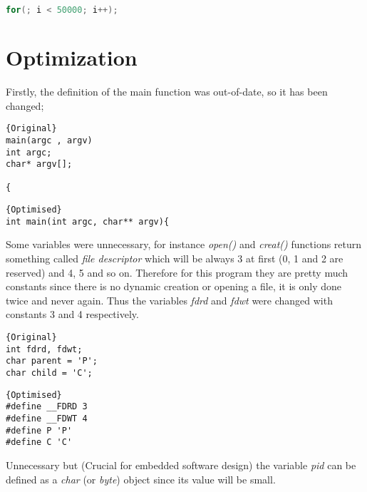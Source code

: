 \documentclass[11pt]{article}
\begin{document}
\begin{lstlisting}[language=C]
	for(; i < 50000; i++);
\end{lstlisting}

\section*{Optimization}

Firstly, the definition of the main function was out-of-date, so it has been changed;

\noindent\begin{minipage}{.45\textwidth}
\begin{lstlisting}[caption=Original,frame=tlrb]{Original}
main(argc , argv)
int argc; 
char* argv[];

{
\end{lstlisting}
\end{minipage}\hfill
\begin{minipage}{.50\textwidth}
\begin{lstlisting}[caption=Optimised,frame=tlrb]{Optimised}
int main(int argc, char** argv){
\end{lstlisting}
\end{minipage}

Some variables were unnecessary, for instance \textit{open()} and \textit{creat()} functions return something called \textit{file descriptor} which will be always 3 at first (0, 1 and 2 are reserved) and 4, 5 and so on. Therefore for this program they are pretty much constants since there is no dynamic creation or opening a file, it is only done twice and never again. Thus the variables \textit{fdrd} and \textit{fdwt} were changed with constants 3 and 4 respectively.

\noindent\begin{minipage}{.45\textwidth}
\begin{lstlisting}[caption=Original,frame=tlrb]{Original}
int fdrd, fdwt;
char parent = 'P';
char child = 'C';
\end{lstlisting}
\end{minipage}\hfill
\begin{minipage}{.50\textwidth}
\begin{lstlisting}[caption=Optimised,frame=tlrb]{Optimised}
#define __FDRD 3
#define __FDWT 4
#define P 'P'
#define C 'C'
\end{lstlisting}
\end{minipage}

Unnecessary but (Crucial for embedded software design) the variable \textit{pid} can be defined as a \textit{char} (or \textit{byte}) object since its value will be small.
\end{document}
